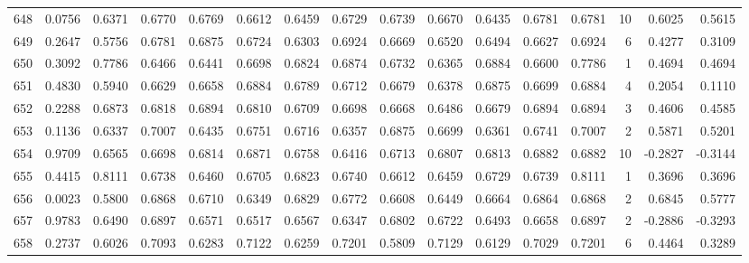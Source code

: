 \begin{tabular}{lrrrrrrrrrrrrrrr}
648 &      0.0756 &  0.6371 &  0.6770 &  0.6769 &  0.6612 &  0.6459 &  0.6729 &  0.6739 &  0.6670 &  0.6435 &   0.6781 &     0.6781 &     10 &                    0.6025 &                     0.5615 \\
649 &      0.2647 &  0.5756 &  0.6781 &  0.6875 &  0.6724 &  0.6303 &  0.6924 &  0.6669 &  0.6520 &  0.6494 &   0.6627 &     0.6924 &      6 &                    0.4277 &                     0.3109 \\
650 &      0.3092 &  0.7786 &  0.6466 &  0.6441 &  0.6698 &  0.6824 &  0.6874 &  0.6732 &  0.6365 &  0.6884 &   0.6600 &     0.7786 &      1 &                    0.4694 &                     0.4694 \\
651 &      0.4830 &  0.5940 &  0.6629 &  0.6658 &  0.6884 &  0.6789 &  0.6712 &  0.6679 &  0.6378 &  0.6875 &   0.6699 &     0.6884 &      4 &                    0.2054 &                     0.1110 \\
652 &      0.2288 &  0.6873 &  0.6818 &  0.6894 &  0.6810 &  0.6709 &  0.6698 &  0.6668 &  0.6486 &  0.6679 &   0.6894 &     0.6894 &      3 &                    0.4606 &                     0.4585 \\
653 &      0.1136 &  0.6337 &  0.7007 &  0.6435 &  0.6751 &  0.6716 &  0.6357 &  0.6875 &  0.6699 &  0.6361 &   0.6741 &     0.7007 &      2 &                    0.5871 &                     0.5201 \\
654 &      0.9709 &  0.6565 &  0.6698 &  0.6814 &  0.6871 &  0.6758 &  0.6416 &  0.6713 &  0.6807 &  0.6813 &   0.6882 &     0.6882 &     10 &                   -0.2827 &                    -0.3144 \\
655 &      0.4415 &  0.8111 &  0.6738 &  0.6460 &  0.6705 &  0.6823 &  0.6740 &  0.6612 &  0.6459 &  0.6729 &   0.6739 &     0.8111 &      1 &                    0.3696 &                     0.3696 \\
656 &      0.0023 &  0.5800 &  0.6868 &  0.6710 &  0.6349 &  0.6829 &  0.6772 &  0.6608 &  0.6449 &  0.6664 &   0.6864 &     0.6868 &      2 &                    0.6845 &                     0.5777 \\
657 &      0.9783 &  0.6490 &  0.6897 &  0.6571 &  0.6517 &  0.6567 &  0.6347 &  0.6802 &  0.6722 &  0.6493 &   0.6658 &     0.6897 &      2 &                   -0.2886 &                    -0.3293 \\
658 &      0.2737 &  0.6026 &  0.7093 &  0.6283 &  0.7122 &  0.6259 &  0.7201 &  0.5809 &  0.7129 &  0.6129 &   0.7029 &     0.7201 &      6 &                    0.4464 &                     0.3289 \\

\end{tabular}
